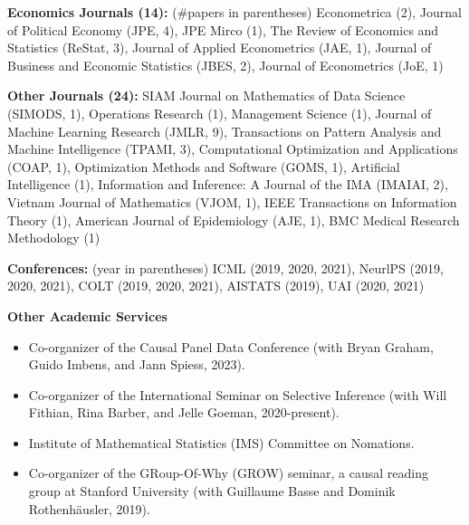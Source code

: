 \documentclass{article}
\begin{document}
\vspace{2mm}
\noindent \textbf{Economics Journals (14): }(\#papers in parentheses) Econometrica (2), Journal of Political Economy (JPE, 4), JPE Mirco (1), The Review of Economics and Statistics (ReStat, 3), Journal of Applied Econometrics (JAE, 1), Journal of Business and Economic Statistics (JBES, 2), Journal of Econometrics (JoE, 1)

\vspace{2mm}
\noindent \textbf{Other Journals (24): } SIAM Journal on Mathematics of Data Science (SIMODS, 1), Operations Research (1), Management Science (1), Journal of Machine Learning Research (JMLR, 9), Transactions on Pattern Analysis and Machine Intelligence (TPAMI, 3), Computational Optimization and Applications (COAP, 1), Optimization Methods and Software (GOMS, 1), Artificial Intelligence (1), Information and Inference: A Journal of the IMA (IMAIAI, 2), Vietnam Journal of Mathematics (VJOM, 1), IEEE Transactions on Information Theory (1), American Journal of Epidemiology (AJE, 1), BMC Medical Research Methodology (1)

\vspace{2mm}
\noindent \textbf{Conferences: }(year in parentheses) ICML (2019, 2020, 2021), NeurlPS (2019, 2020, 2021), COLT (2019, 2020, 2021), AISTATS (2019), UAI (2020, 2021)

\vspace{7mm}
\begin{large}
\noindent \textbf{Other Academic Services}
\end{large}

\begin{itemize}
\item Co-organizer of the Causal Panel Data Conference (with Bryan Graham, Guido Imbens, and Jann Spiess, 2023).
\item Co-organizer of the International Seminar on Selective Inference (with Will Fithian, Rina Barber, and Jelle Goeman, 2020-present).
\item Institute of Mathematical Statistics (IMS) Committee on Nomations.
\item Co-organizer of the GRoup-Of-Why (GROW) seminar, a causal reading group at Stanford University (with Guillaume Basse and Dominik Rothenhäusler, 2019).
\end{itemize}
\end{document}
